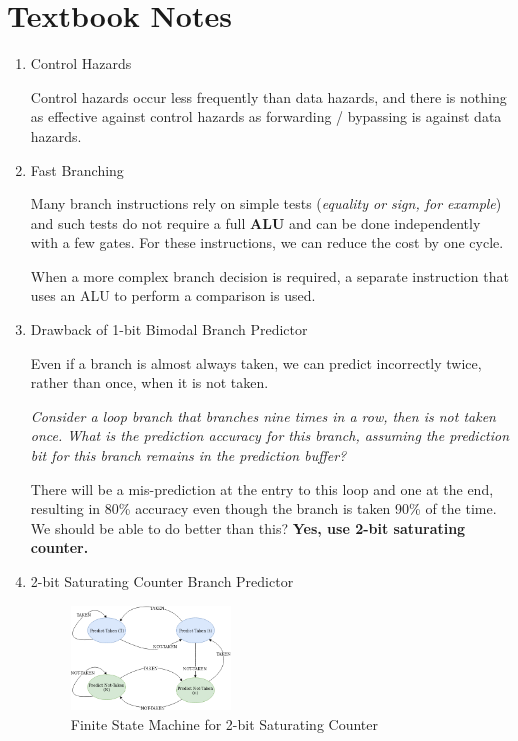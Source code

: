 \documentclass[12pt]{article}
\newenvironment{QandA}{\begin{enumerate}[label=\bfseries\arabic*.]\bfseries}
                      {\end{enumerate}}
\newenvironment{answered}{\par\quad\normalfont}{}
\begin{document}
\section{Textbook Notes}
\begin{QandA}
\item Control Hazards
\begin{answered}
Control hazards occur less frequently than data hazards, and there is nothing as effective against control hazards as forwarding / bypassing is against data hazards.
\end{answered}

\item Fast Branching
\begin{answered}
Many branch instructions rely on simple tests (\textit{equality or sign, for example}) and such tests do not require a full \textbf{ALU} and can be done independently with a few gates. For these instructions, we can reduce the cost by one cycle. 

When a more complex branch decision is required, a separate instruction that uses an ALU to perform a comparison is used.
\end{answered}

\item Drawback of 1-bit Bimodal Branch Predictor
\begin{answered}
Even if a branch is almost always taken, we can predict incorrectly twice, rather than once, when it is not taken. 

\textit{Consider a loop branch that branches nine times in a row, then is not taken once. What is the prediction accuracy for this branch, assuming the prediction bit for this branch remains in the prediction buffer?}

There will be a mis-prediction at the entry to this loop and one at the end, resulting in 80\% accuracy even though the branch is taken 90\% of the time. We should be able to do better than this? \textbf{Yes, use 2-bit saturating counter.}
\end{answered}

\item 2-bit Saturating Counter Branch Predictor
\begin{answered}
\begin{figure}[!ht]
\centering
\includegraphics[width=0.4\textwidth]{chapter7_imgs/2bitsatcounter.png}
\caption{Finite State Machine for 2-bit Saturating Counter}
\label{2bitsatcounter}
\end{figure}
\end{answered}

\end{QandA}
\end{document}
